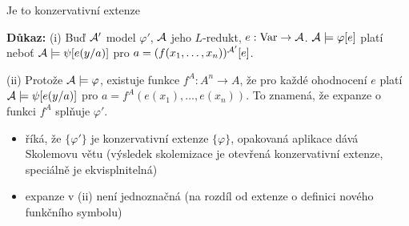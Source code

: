\documentclass{beamer}
\begin{document}
\begin{frame}{Je to konzervativní extenze}

    \pause

    \pause
    \textbf{Důkaz:} \pause \alert{(i)} Buď $\mathcal{A}'$ model $\varphi'$, $\mathcal{A}$ jeho $L$-redukt, $e:\operatorname{Var}\to\mathcal{A}$. $\mathcal{A}\models\varphi[e]$ platí neboť $\mathcal{A}\models\psi[e(y/a)]$ pro $a=(f(x_1,\dots,x_n))^{\mathcal{A}'}[e]$.
    
    \pause
    \alert{(ii)} Protože $\mathcal{A}\models\varphi$, existuje funkce $f^A:A^n\to A$, že pro každé ohodnocení $e$ platí $\mathcal{A}\models \psi[e(y/a)]$ pro $a=f^A(e(x_1),\dots,e(x_n))$. To znamená, že expanze o funkci $f^A$ splňuje $\varphi'$.\hfill\qedsymbol 
    \begin{itemize}
        \item \pause říká, že $\{\varphi'\}$ je konzervativní extenze $\{\varphi\}$, opakovaná aplikace dává \alert{Skolemovu větu} (výsledek skolemizace je otevřená konzervativní extenze, speciálně je ekvisplnitelná)  
        \item \pause expanze v (ii) není jednoznačná (na rozdíl od extenze o definici nového funkčního symbolu)      
    \end{itemize}
   
\end{frame}
\end{document}
